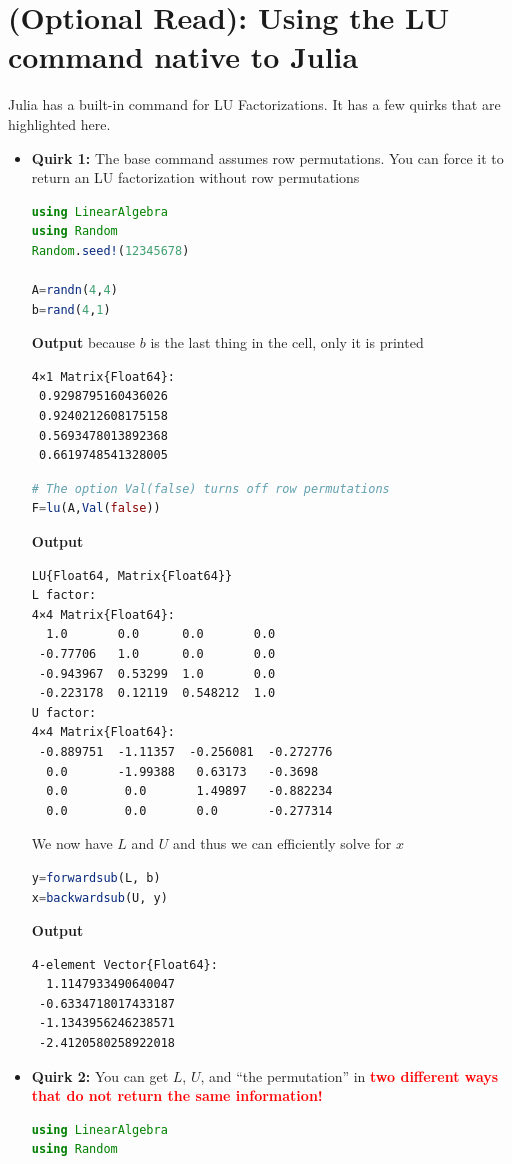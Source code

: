 \section{(Optional Read): Using the LU command native to Julia}
\label{sec:nativeLUcommand}
Julia has a built-in command for LU Factorizations. It has a few quirks that are highlighted here.
\begin{itemize}
    \item \textbf{Quirk 1:} The base command assumes row permutations. You can force it to return an LU factorization without row permutations
\begin{lstlisting}[language=Julia,style=mystyle]
using LinearAlgebra    
using Random
Random.seed!(12345678)

A=randn(4,4)
b=rand(4,1)
\end{lstlisting}
\textbf{Output} because $b$ is the last thing in the cell, only it is printed 
\begin{verbatim}
4×1 Matrix{Float64}:
 0.9298795160436026
 0.9240212608175158
 0.5693478013892368
 0.6619748541328005
\end{verbatim}
\begin{lstlisting}[language=Julia,style=mystyle]
# The option Val(false) turns off row permutations
F=lu(A,Val(false)) 
\end{lstlisting}
\textbf{Output}
\begin{verbatim}
LU{Float64, Matrix{Float64}}
L factor:
4×4 Matrix{Float64}:
  1.0       0.0      0.0       0.0
 -0.77706   1.0      0.0       0.0
 -0.943967  0.53299  1.0       0.0
 -0.223178  0.12119  0.548212  1.0
U factor:
4×4 Matrix{Float64}:
 -0.889751  -1.11357  -0.256081  -0.272776
  0.0       -1.99388   0.63173   -0.3698
  0.0        0.0       1.49897   -0.882234
  0.0        0.0       0.0       -0.277314
\end{verbatim}
We now have $L$ and $U$ and thus we can efficiently solve for $x$
\begin{lstlisting}[language=Julia,style=mystyle]
y=forwardsub(L, b)
x=backwardsub(U, y)
\end{lstlisting}
\textbf{Output}
\begin{verbatim}
4-element Vector{Float64}:
  1.1147933490640047
 -0.6334718017433187
 -1.1343956246238571
 -2.4120580258922018
\end{verbatim}
    
\item \textbf{Quirk 2:} You can get $L$, $U$, and ``the permutation'' in \textcolor{red}{\bf two different ways that do not return the same information!}
\begin{lstlisting}[language=Julia,style=mystyle]
using LinearAlgebra
using Random


\end{lstlisting}
\end{itemize}
